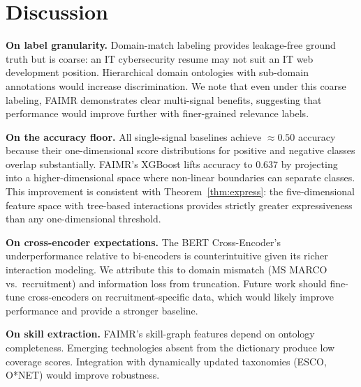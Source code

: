 \documentclass[smallcondensed,numbers]{sn-jnl}
\begin{document}
\section{Discussion}
\label{sec:discussion}

\textbf{On label granularity.} Domain-match labeling provides leakage-free ground truth but is coarse: an IT cybersecurity resume may not suit an IT web development position. Hierarchical domain ontologies with sub-domain annotations would increase discrimination. We note that even under this coarse labeling, FAIMR demonstrates clear multi-signal benefits, suggesting that performance would improve further with finer-grained relevance labels.

\textbf{On the accuracy floor.} All single-signal baselines achieve $\approx 0.50$ accuracy because their one-dimensional score distributions for positive and negative classes overlap substantially. FAIMR's XGBoost lifts accuracy to $0.637$ by projecting into a higher-dimensional space where non-linear boundaries can separate classes. This improvement is consistent with Theorem~\ref{thm:express}: the five-dimensional feature space with tree-based interactions provides strictly greater expressiveness than any one-dimensional threshold.

\textbf{On cross-encoder expectations.} The BERT Cross-Encoder's underperformance relative to bi-encoders is counterintuitive given its richer interaction modeling. We attribute this to domain mismatch (MS MARCO vs.\ recruitment) and information loss from truncation. Future work should fine-tune cross-encoders on recruitment-specific data, which would likely improve performance and provide a stronger baseline.

\textbf{On skill extraction.} FAIMR's skill-graph features depend on ontology completeness. Emerging technologies absent from the dictionary produce low coverage scores. Integration with dynamically updated taxonomies (ESCO, O*NET) would improve robustness.
\end{document}
